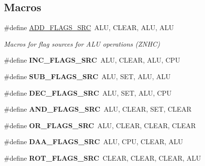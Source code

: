 \subsection*{Macros}
\begin{DoxyCompactItemize}
\item 
\mbox{\label{cpu-alu_8h_a2b571a60eade9bd62f819f0ac4fde50b}} 
\#define \hyperlink{cpu-alu_8h_a2b571a60eade9bd62f819f0ac4fde50b}{A\+D\+D\+\_\+\+F\+L\+A\+G\+S\+\_\+\+S\+RC}~A\+LU,   C\+L\+E\+AR, A\+LU,   A\+LU
\begin{DoxyCompactList}\small\item\em Macros for flag sources for A\+LU operations (Z\+N\+HC) \end{DoxyCompactList}\item 
\mbox{\label{cpu-alu_8h_a24d828827dc92d1ec35b600aea7e2d35}} 
\#define {\bfseries I\+N\+C\+\_\+\+F\+L\+A\+G\+S\+\_\+\+S\+RC}~A\+LU,   C\+L\+E\+AR, A\+LU,   C\+PU
\item 
\mbox{\label{cpu-alu_8h_aab5c090154425839c3c715f9225254e8}} 
\#define {\bfseries S\+U\+B\+\_\+\+F\+L\+A\+G\+S\+\_\+\+S\+RC}~A\+LU,   S\+ET,   A\+LU,   A\+LU
\item 
\mbox{\label{cpu-alu_8h_ae3324c6b158f162841d809d3c6c531f9}} 
\#define {\bfseries D\+E\+C\+\_\+\+F\+L\+A\+G\+S\+\_\+\+S\+RC}~A\+LU,   S\+ET,   A\+LU,   C\+PU
\item 
\mbox{\label{cpu-alu_8h_a07755702907009b3b081b476703cd083}} 
\#define {\bfseries A\+N\+D\+\_\+\+F\+L\+A\+G\+S\+\_\+\+S\+RC}~A\+LU,   C\+L\+E\+AR, S\+ET,   C\+L\+E\+AR
\item 
\mbox{\label{cpu-alu_8h_a09b09f9edf41d212ab211df5e83393d3}} 
\#define {\bfseries O\+R\+\_\+\+F\+L\+A\+G\+S\+\_\+\+S\+RC}~A\+LU,   C\+L\+E\+AR, C\+L\+E\+AR, C\+L\+E\+AR
\item 
\mbox{\label{cpu-alu_8h_ab1ce33877a2a84e3349ecbb55ed68a66}} 
\#define {\bfseries D\+A\+A\+\_\+\+F\+L\+A\+G\+S\+\_\+\+S\+RC}~A\+LU,   C\+PU,   C\+L\+E\+AR, A\+LU
\item 
\mbox{\label{cpu-alu_8h_a2837178816f9737cd3808d8ef41401f0}} 
\#define {\bfseries R\+O\+T\+\_\+\+F\+L\+A\+G\+S\+\_\+\+S\+RC}~C\+L\+E\+AR, C\+L\+E\+AR, C\+L\+E\+AR, A\+LU

\end{DoxyCompactItemize}
